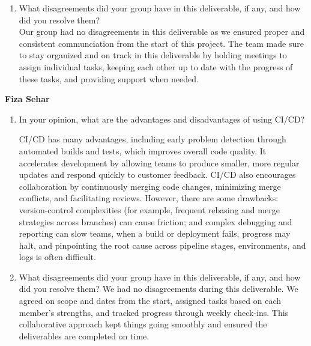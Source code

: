 \documentclass{article}
\begin{document}
\begin{enumerate}
\begin{enumerate}
    \item What disagreements did your group have in this deliverable, if any,
    and how did you resolve them? \\[1ex]
    Our group had no disagreements in this deliverable as we ensured proper 
    and consistent communciation from the start of this project. The team made
    sure to stay organized and on track in this deliverable 
    by holding meetings to assign individual tasks, keeping each other up to date with 
    the progress of these tasks, and providing support when needed. 

\end{enumerate}
\textbf{Fiza Sehar}

\begin{enumerate}
	Creating a development plan before beginning a project is critical because it provides a clear path for the team, specifies the roles and 		responsibilities, and establishes realistic deadlines and milestones.  It enables the early identification of possible risks and dependencies, ensuring the implementation of mitigation methods.  The plan helps in the coordination of team efforts, effective progress tracking, and optimal resource use by establishing communication techniques and workflow processes.  In conclusion, it provides structure, decreases uncertainty, and increases the confidence of stakeholders that the project will go as planned.
	\item In your opinion, what are the advantages and disadvantages of using CI/CD?

    CI/CD has many advantages, including early problem detection through automated builds and tests, which improves overall code quality.  It  accelerates development by allowing teams to produce smaller, more regular updates and respond quickly to customer feedback.  CI/CD also encourages collaboration by continuously merging code changes, minimizing merge conflicts, and facilitating reviews.  However, there are some drawbacks: version-control complexities (for example, frequent rebasing and merge strategies across branches) can cause friction; and complex debugging and reporting can slow teams, when a build or deployment fails, progress may halt, and pinpointing the root cause across pipeline stages, environments, and logs is often difficult.   
	\item What disagreements did your group have in this deliverable, if any,
    and how did you resolve them?
    We had no disagreements during this deliverable.  We agreed on scope and dates from the start, assigned tasks based on each member's strengths, and tracked progress through weekly check-ins.  This collaborative approach kept things going smoothly and ensured the deliverables are completed on time.
\end{enumerate}
\newpage{}


\end{enumerate}
\end{document}
